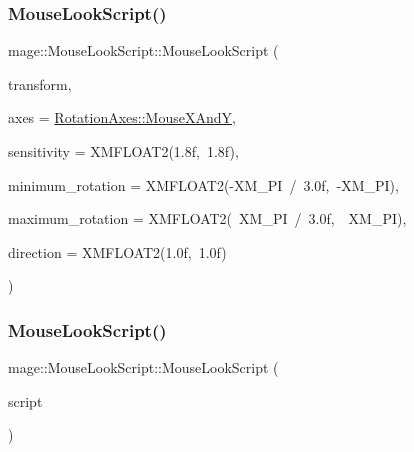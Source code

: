 \subsubsection{\texorpdfstring{Mouse\+Look\+Script()}{MouseLookScript()}\hspace{0.1cm}{\footnotesize\ttfamily [1/3]}}
{\footnotesize\ttfamily mage\+::\+Mouse\+Look\+Script\+::\+Mouse\+Look\+Script (\begin{DoxyParamCaption}\item[{\hyperlink{structmage_1_1_transform_node}{Transform\+Node} $\ast$}]{transform,  }\item[{\hyperlink{classmage_1_1_mouse_look_script_af63fd955f796c11e0378813e5d1ab5f8}{Rotation\+Axes}}]{axes = {\ttfamily \hyperlink{classmage_1_1_mouse_look_script_af63fd955f796c11e0378813e5d1ab5f8a109431b32c091e8a7ad541546c66c522}{Rotation\+Axes\+::\+Mouse\+X\+AndY}},  }\item[{const X\+M\+F\+L\+O\+A\+T2 \&}]{sensitivity = {\ttfamily XMFLOAT2(1.8f,~1.8f)},  }\item[{const X\+M\+F\+L\+O\+A\+T2 \&}]{minimum\+\_\+rotation = {\ttfamily XMFLOAT2(-\/XM\+\_\+PI~/~3.0f,~-\/XM\+\_\+PI)},  }\item[{const X\+M\+F\+L\+O\+A\+T2 \&}]{maximum\+\_\+rotation = {\ttfamily XMFLOAT2(~XM\+\_\+PI~/~3.0f,~~XM\+\_\+PI)},  }\item[{const X\+M\+F\+L\+O\+A\+T2 \&}]{direction = {\ttfamily XMFLOAT2(1.0f,~1.0f)} }\end{DoxyParamCaption})\hspace{0.3cm}{\ttfamily [explicit]}}

\hypertarget{classmage_1_1_mouse_look_script_a54bd09419068ab61c4dd6fda412771d3}{}\label{classmage_1_1_mouse_look_script_a54bd09419068ab61c4dd6fda412771d3} 
\subsubsection{\texorpdfstring{Mouse\+Look\+Script()}{MouseLookScript()}\hspace{0.1cm}{\footnotesize\ttfamily [2/3]}}
{\footnotesize\ttfamily mage\+::\+Mouse\+Look\+Script\+::\+Mouse\+Look\+Script (\begin{DoxyParamCaption}\item[{const \hyperlink{classmage_1_1_mouse_look_script}{Mouse\+Look\+Script} \&}]{script }\end{DoxyParamCaption})\hspace{0.3cm}{\ttfamily [delete]}}

